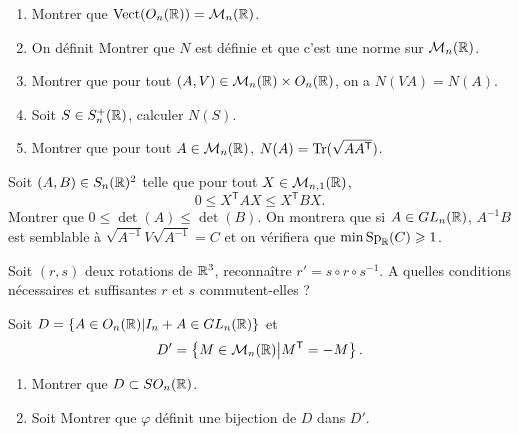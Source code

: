 \documentclass[12pt]{article}
\begin{document}
\begin{exercise}
	\phantom{}
	\begin{enumerate}
		\item Montrer que $\operatorname{Vect}(O_n(\mathbb{R}))=\mathcal{M}_{n}(\mathbb{R})$.
		\item On définit 
		Montrer que $N$ est définie et que c'est une norme sur $\mathcal{M}_{n}(\mathbb{R})$.
		\item Montrer que pour tout $(A,V)\in\mathcal{M}_{n}(\mathbb{R})\times O_n(\mathbb{R})$, on a $N(VA)=N(A)$.
		\item Soit $S\in S_n^{+}(\mathbb{R})$, calculer $N(S)$.
		\item Montrer que pour tout $A\in\mathcal{M}_{n}(\mathbb{R})$, $N(A)=\operatorname{Tr}(\sqrt{AA^{\mathsf{T}}})$.
	\end{enumerate}
\end{exercise}

\begin{exercise}
	Soit $(A,B)\in S_n(\mathbb{R})^{2}$ telle que pour tout $X\in\mathcal{M}_{n,1}(\mathbb{R})$,
	\begin{equation}
		0\leqslant X^{\mathsf{T}}AX\leqslant X^{\mathsf{T}}BX.
	\end{equation}
	Montrer que $0\leqslant \det(A)\leqslant \det(B)$. On montrera que si $A\in GL_{n}(\mathbb{R})$, $A^{-1}B$ est semblable à $\sqrt{A^{-1}}V\sqrt{A^{-1}}=C$ et on vérifiera que $\min\operatorname{Sp}_{\mathbb{R}}(C)\geqslant1$.
\end{exercise}

\begin{exercise}
	Soit $(r,s)$ deux rotations de $\mathbb{R}^{3}$, reconnaître $r'=s\circ r\circ s^{-1}$. A quelles conditions nécessaires et suffisantes $r$ et $s$ commutent-elles ?
\end{exercise}

\begin{exercise}
	Soit $D=\left\lbrace A\in O_n(\mathbb{R})\middle| I_n+A\in GL_n(\mathbb{R})\right\rbrace$ et 
	\begin{equation*}
		D'=\left\lbrace M\in \mathcal{M}_n(\mathbb{R})\middle| M^{\mathsf{T}}=-M\right\rbrace.
	\end{equation*}
	\begin{enumerate}
		\item Montrer que $D\subset SO_n(\mathbb{R})$.
		\item Soit 
		Montrer que $\varphi$ définit une bijection de $D$ dans $D'$.
	\end{enumerate}
\end{exercise}
\end{document}
